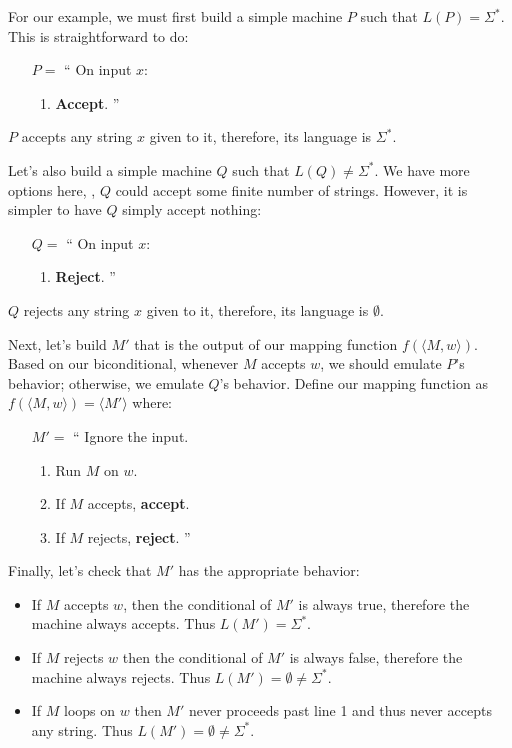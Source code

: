 \documentclass[11pt]{book}
\newcommand{\desc}[1]{\langle #1 \rangle}
\newenvironment{turing}[2]
 {\begin{enumerate}[leftmargin=0pt,labelsep=0pt,align=left,parsep=0pt]
  \item[$#1={}$]``\ignorespaces#2
  \begin{enumerate}[
    nosep,
    align=left,
    labelwidth=1.5em,
    label=\bfseries\arabic{*}.,
    ref=\arabic{*}
  ]}
 {\unskip''\end{enumerate}\end{enumerate}}
\newcommand{\bitem}{\item\hspace*{1em}\ignorespaces}
\begin{document}
For our example, we must first build a simple machine $P$ such that $L(P) = \Sigma^*$.
This is straightforward to do:
\begin{center}
  \begin{turing}{P}{ On input $x$: }
    \item \textbf{Accept}.
  \end{turing}
\end{center}
$P$ accepts any string $x$ given to it, therefore, its language is $\Sigma^*$.

Let's also build a simple machine $Q$ such that $L(Q) \neq \Sigma^*$.
We have more options here, \ie, $Q$ could accept some finite number of strings.
However, it is simpler to have $Q$ simply accept nothing:
\begin{center}
  \begin{turing}{Q}{ On input $x$: }
    \item \textbf{Reject}.
  \end{turing}
\end{center}
$Q$ rejects any string $x$ given to it, therefore, its language is $\emptyset$.

Next, let's build $M'$ that is the output of our mapping function $f(\desc{M, w})$.
Based on our biconditional, whenever $M$ accepts $w$, we should emulate $P$'s behavior; otherwise, we emulate $Q$'s behavior.
Define our mapping function as $f(\desc{M, w}) = \desc{M'}$ where:
\begin{center}
  \begin{turing}{M'}{ Ignore the input. }
    \item Run $M$ on $w$.
      \bitem If $M$ accepts, \textbf{accept}.
      \bitem If $M$ rejects, \textbf{reject}.
  \end{turing}
\end{center}

Finally, let's check that $M'$ has the appropriate behavior:
\begin{itemize}[itemsep=0pt]
  \item If $M$ accepts $w$, then the conditional of $M'$ is always true, therefore the machine always accepts.
    Thus $L(M') = \Sigma^*$.
  \item If $M$ rejects $w$ then the conditional of $M'$ is always false, therefore the machine always rejects.
    Thus $L(M') = \emptyset \neq \Sigma^*$.
  \item If $M$ loops on $w$ then $M'$ never proceeds past line 1 and thus never accepts any string.
    Thus $L(M') = \emptyset \neq \Sigma^*$.
\end{itemize}
\end{document}
